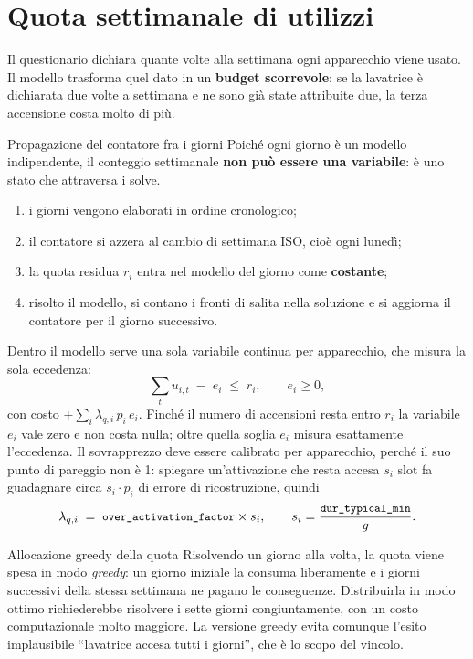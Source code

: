 \section{Quota settimanale di utilizzi}

Il questionario dichiara quante volte alla settimana ogni apparecchio viene usato. Il modello
trasforma quel dato in un \textbf{budget scorrevole}: se la lavatrice è dichiarata due volte a
settimana e ne sono già state attribuite due, la terza accensione costa molto di più.

\begin{modelbox}{Propagazione del contatore fra i giorni}
Poiché ogni giorno è un modello indipendente, il conteggio settimanale \textbf{non può essere una
variabile}: è uno stato che attraversa i solve.
\begin{enumerate}[nosep,leftmargin=1.6em]
  \item i giorni vengono elaborati in ordine cronologico;
  \item il contatore si azzera al cambio di settimana ISO, cioè ogni lunedì;
  \item la quota residua $r_i$ entra nel modello del giorno come \textbf{costante};
  \item risolto il modello, si contano i fronti di salita nella soluzione e si aggiorna il
        contatore per il giorno successivo.
\end{enumerate}
\end{modelbox}

Dentro il modello serve una sola variabile continua per apparecchio, che misura la sola eccedenza:
\begin{equation}
  \sum_{t} u_{i,t} \;-\; e_i \;\le\; r_i ,
  \qquad e_i \ge 0 ,
  \label{eq:quota}
\end{equation}
con costo $+\sum_i \lambda_{q,i} \, p_i \, e_i$. Finché il numero di accensioni resta entro $r_i$ la
variabile $e_i$ vale zero e non costa nulla; oltre quella soglia $e_i$ misura esattamente
l'eccedenza. Il sovrapprezzo deve essere calibrato per apparecchio, perché il suo punto di pareggio
non è 1: spiegare un'attivazione che resta accesa $s_i$ slot fa guadagnare circa $s_i \cdot p_i$ di
errore di ricostruzione, quindi
\begin{equation}
  \lambda_{q,i} \;=\; \texttt{\small over\_activation\_factor} \times s_i ,
  \qquad s_i = \frac{\texttt{\small dur\_typical\_min}}{g} .
  \label{eq:quota-calibrazione}
\end{equation}

\begin{warnbox}{Allocazione greedy della quota}
Risolvendo un giorno alla volta, la quota viene spesa in modo \emph{greedy}: un giorno iniziale la
consuma liberamente e i giorni successivi della stessa settimana ne pagano le conseguenze.
Distribuirla in modo ottimo richiederebbe risolvere i sette giorni congiuntamente, con un costo
computazionale molto maggiore. La versione greedy evita comunque l'esito implausibile
``lavatrice accesa tutti i giorni'', che è lo scopo del vincolo.
\end{warnbox}

